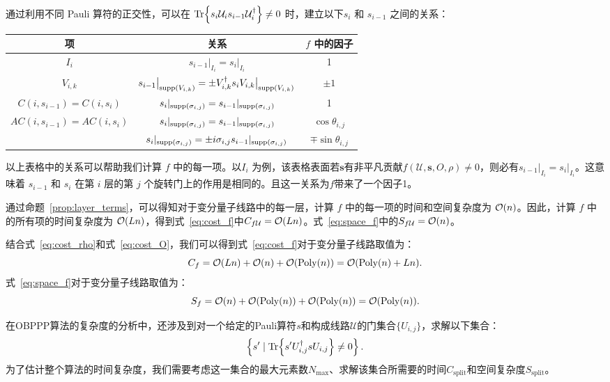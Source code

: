 \begin{remark}\label{remark:f_ele}
通过利用不同 Pauli 算符的正交性，可以在 $\Tr{s_i\mathcal{U}_i s_{i-1}\mathcal{U}_i^\dagger} \neq 0$ 时，建立以下$s_i$ 和 $s_{i-1}$ 之间的关系：

\begin{tabular}{|c|c|c|}
  \hline
   项 & 关系 & $f$ 中的因子\\
  \hline
  ${I_i}$ &$s_{i-1}\big|_{I_i} = s_{i}\big|_{I_i}$& 1 \\
  \hline
  $V_{i,k}$ &$s_{i-1}\big|_{\text{supp} \left( V_{i,k} \right)}= \pm V_{i,k}^{\dagger} s_{i}V_{i,k}\big|_{\text{supp} \left( V_{i,k} \right)}$& $\pm 1$ \\
  \hline
  $C(i,s_{i-1})=C(i,s_{i})$&$s_{i}|_{\text{supp} \left( \sigma_{i,j} \right)}=s_{i-1}|_{\text{supp} \left( \sigma_{i,j} \right)}$& 1 \\
  \hline
  \multirow{2}{*}{$AC(i,s_{i-1})=AC(i,s_{i})$}
  &$s_{i}|_{\text{supp} \left( \sigma_{i,j} \right)}=s_{i-1}|_{\text{supp} \left( \sigma_{i,j} \right)}$& $\cos{\theta_{i,j}}$ \\
  \cline{2-3}
  &$s_{i}|_{\text{supp} \left( \sigma_{i,j} \right)}=\pm i \sigma_{i,j} s_{i-1}|_{\text{supp} \left( \sigma_{i,j} \right)}$& $\mp \sin{\theta_{i,j}}$ \\
  \hline
\end{tabular}

以上表格中的关系可以帮助我们计算 $f$ 中的每一项。以$I_i$ 为例，该表格表面若$\bm{s}$有非平凡贡献$f(\mathcal{U},\bm{s},O,\rho) \neq 0$，则必有$s_{i-1}\big|_{I_i} = s_{i}\big|_{I_i}$。这意味着 $s_{i-1}$ 和 $s_{i}$ 在第 $i$ 层的第 $j$ 个旋转门上的作用是相同的。且这一关系为$f$带来了一个因子1。

通过命题~\ref{prop:layer_terms}，可以得知对于变分量子线路中的每一层，计算 $f$ 中的每一项的时间和空间复杂度为 $\order{n}$。因此，计算 $f$ 中的所有项的时间复杂度为 $\order{L n}$，得到式~\eqref{eq:cost_f}中$C_{f\mathcal{U}}=\order{L n}$。式~\eqref{eq:space_f}中的$S_{f\mathcal{U}}=\order{n}$。
\end{remark}

结合式~\eqref{eq:cost_rho}和式~\eqref{eq:cost_O}，我们可以得到式~\eqref{eq:cost_f}对于变分量子线路取值为：
\begin{equation}
    C_f=\order{L n}+\order{n}+\order{\poly(n)}=\order{\poly(n)+L n}.
\end{equation}
式~\eqref{eq:space_f}对于变分量子线路取值为：
\begin{equation}
    S_f=\order{n}+\order{\poly(n)}+\order{\poly(n)}=\order{\poly(n)}.
\end{equation}


在OBPPP算法的复杂度的分析中，还涉及到对一个给定的Pauli算符$s$和构成线路$\mathcal{U}$的门集合$\{U_{i,j}\}$，求解以下集合：
\begin{equation}
    \left\{ s'\mid \Tr{s' U^\dagger_{i,j}s U_{i,j}}\neq 0 \right\}.
\end{equation}
为了估计整个算法的时间复杂度，我们需要考虑这一集合的最大元素数$N_{\text{max}}$、求解该集合所需要的时间$C_{\text{split}}$和空间复杂度$S_{\text{split}}$。

